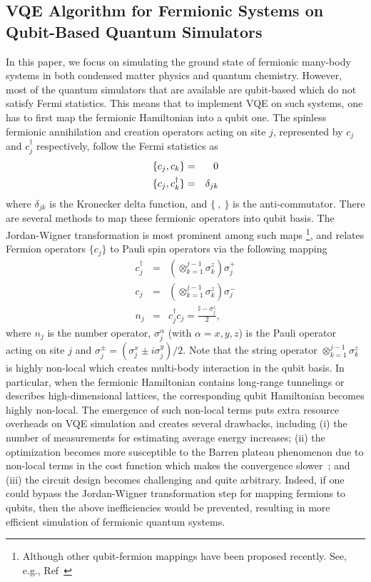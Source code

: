 \documentclass[aps, pra, reprint, superscriptaddress]{revtex4-1}
\begin{document}
\subsection{VQE Algorithm for Fermionic Systems on Qubit-Based Quantum Simulators }
\label{sec:VQE_Qubit_Simulator}

In this paper, we focus on simulating the ground state of fermionic many-body systems in both condensed matter physics and quantum chemistry. However, most of the quantum simulators that are available are qubit-based which do not satisfy Fermi statistics. This means that to implement VQE on such systems, one has to first map the fermionic Hamiltonian into a qubit one. The spinless fermionic annihilation and creation operators acting on site $j$, represented by $c_j$ and $c_j^\dagger$ respectively, follow the Fermi statistics as 
\begin{eqnarray}
    \{c_j,c_k\}&=&0 \cr
    \{c_j,c_k^\dagger\}&=&\delta_{jk}
\end{eqnarray}
where $\delta_{jk}$ is the Kronecker delta function, and $\lbrace ~,~ \rbrace $ is the anti-commutator. There are several methods to map these fermionic operators  into qubit basis. The Jordan-Wigner transformation is most prominent among such maps \footnote{Although other qubit-fermion mappings have been proposed recently. See, e.g., Ref~\cite{Steudtner2018fermion} }, and relates Fermion operators $\lbrace c_{j}\rbrace$ to Pauli spin operators via the following mapping
\begin{eqnarray}
    c_{j}^{\dagger} & = &\left(\otimes_{k=1}^{j-1}\sigma_k^z\right) \sigma_{j}^{+} \\
    c_{j} & = &\left(\otimes_{k=1}^{j-1}\sigma_k^z \right) \sigma_{j}^{-} \\
    n_j&=&c_{j}^{\dagger}c_{j} = \frac{\mathbb{I}-\sigma_{j}^{z}}{2},
\end{eqnarray}
where $n_j$ is the number operator, $\sigma^\alpha_j$ (with $\alpha{=}x,y,z$) is the Pauli operator acting on site 
$j$ and $\sigma^\pm_j{=}(\sigma^x_j\pm i\sigma^y_j)/2$. Note that the string operator $\otimes_{k{=}1}^{j-1}\sigma_k^z$ is highly non-local which creates multi-body interaction in the qubit basis. In particular, when the fermionic Hamiltonian contains long-range tunnelings or describes high-dimensional lattices, the corresponding qubit Hamiltonian becomes highly non-local. The emergence of such non-local terms puts extra resource overheads on VQE simulation and creates several drawbacks, including (i) the number of measurements for estimating average energy increases; (ii) the optimization becomes more susceptible to the Barren plateau phenomenon due to non-local terms in the cost function which makes the  convergence slower~\cite{mcclean2018barren,cerezo2021cost}; and (iii) the circuit design becomes challenging and quite arbitrary. Indeed, if one could bypass the Jordan-Wigner transformation step for mapping fermions to qubits, then the above inefficiencies would be prevented, resulting in more efficient simulation of fermionic quantum systems. 
\end{document}

